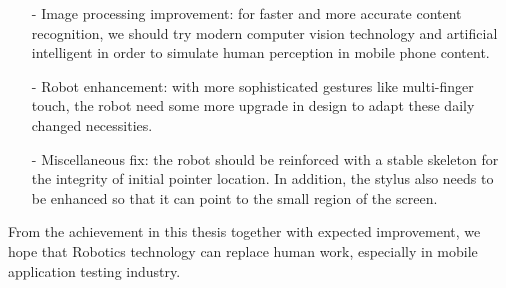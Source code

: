 	\begin{itemize}
		\item[-] Image processing improvement: for faster and more accurate content recognition, we should try modern computer vision technology and artificial intelligent in order to simulate human perception in mobile phone content. 
		\item[-] Robot enhancement: with more sophisticated gestures like multi-finger touch, the robot need some more upgrade in design to adapt these daily changed necessities.
		\item[-] Miscellaneous fix: the robot should be reinforced with a stable skeleton for the integrity of initial pointer location. In addition, the stylus also needs to be enhanced so that it can point to the small region of the screen.
	\end{itemize}

From the achievement in this thesis together with expected improvement, we hope that Robotics technology can replace human work, especially in mobile application testing industry.